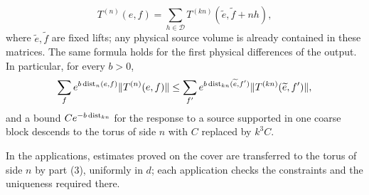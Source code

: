 \begin{lemma}
\begin{enumerate}
\[
 T^{(n)}(e,f)=\sum_{h\in\mathcal D}T^{(kn)}(\widetilde e,\widetilde f+nh),
\]
where $\widetilde e,\widetilde f$ are fixed lifts; any physical source volume is already contained in these matrices. The same formula holds for the first physical differences of the output. In particular, for every $b>0$,
\[
 \sum_fe^{b\operatorname{dist}_n(e,f)}\lVert T^{(n)}(e,f)\rVert\le\sum_{f'}e^{b\operatorname{dist}_{kn}(\widetilde e,f')}\lVert T^{(kn)}(\widetilde e,f')\rVert,
\]
and a bound $Ce^{-b\operatorname{dist}_{kn}}$ for the response to a source supported in one coarse block descends to the torus of side $n$ with $C$ replaced by $k^3C$.
\end{enumerate}
In the applications, estimates proved on the cover are transferred to the torus of side $n$ by part (3), uniformly in $d$; each application checks the constraints and the uniqueness required there.
\end{lemma}

